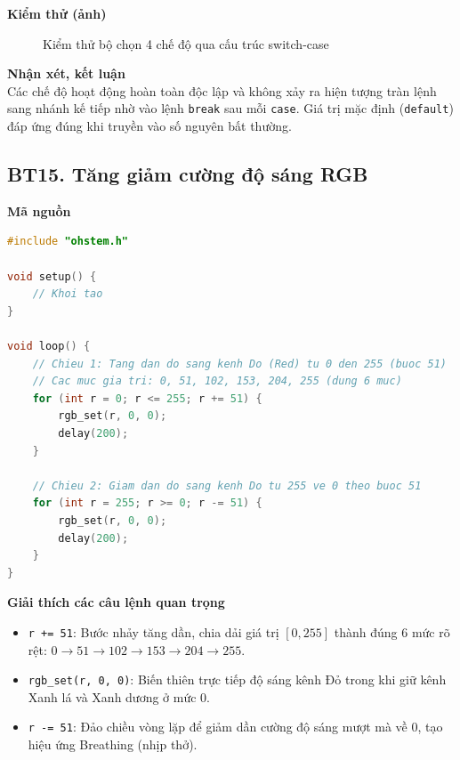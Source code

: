 \noindent\textbf{Kiểm thử (ảnh)}\\
\begin{figure}[H]
    \centering
    \caption{Kiểm thử bộ chọn 4 chế độ qua cấu trúc switch-case}
    \label{fig:bt14}
\end{figure}

\noindent\textbf{Nhận xét, kết luận}\\
Các chế độ hoạt động hoàn toàn độc lập và không xảy ra hiện tượng tràn lệnh sang nhánh kế tiếp nhờ vào lệnh \texttt{break} sau mỗi \texttt{case}. Giá trị mặc định (\texttt{default}) đáp ứng đúng khi truyền vào số nguyên bất thường.


\subsection*{BT15. Tăng giảm cường độ sáng RGB}

\noindent\textbf{Mã nguồn}\\
\begin{lstlisting}[language=C]
#include "ohstem.h"

void setup() {
    // Khoi tao
}

void loop() {
    // Chieu 1: Tang dan do sang kenh Do (Red) tu 0 den 255 (buoc 51)
    // Cac muc gia tri: 0, 51, 102, 153, 204, 255 (dung 6 muc)
    for (int r = 0; r <= 255; r += 51) {
        rgb_set(r, 0, 0);
        delay(200);
    }

    // Chieu 2: Giam dan do sang kenh Do tu 255 ve 0 theo buoc 51
    for (int r = 255; r >= 0; r -= 51) {
        rgb_set(r, 0, 0);
        delay(200);
    }
}
\end{lstlisting}

\noindent\textbf{Giải thích các câu lệnh quan trọng}\\
\begin{itemize}
    \item \texttt{r += 51}: Bước nhảy tăng dần, chia dải giá trị $[0, 255]$ thành đúng 6 mức rõ rệt: $0 \to 51 \to 102 \to 153 \to 204 \to 255$.
    \item \texttt{rgb\_set(r, 0, 0)}: Biến thiên trực tiếp độ sáng kênh Đỏ trong khi giữ kênh Xanh lá và Xanh dương ở mức 0.
    \item \texttt{r -= 51}: Đảo chiều vòng lặp để giảm dần cường độ sáng mượt mà về 0, tạo hiệu ứng Breathing (nhịp thở).
\end{itemize}


